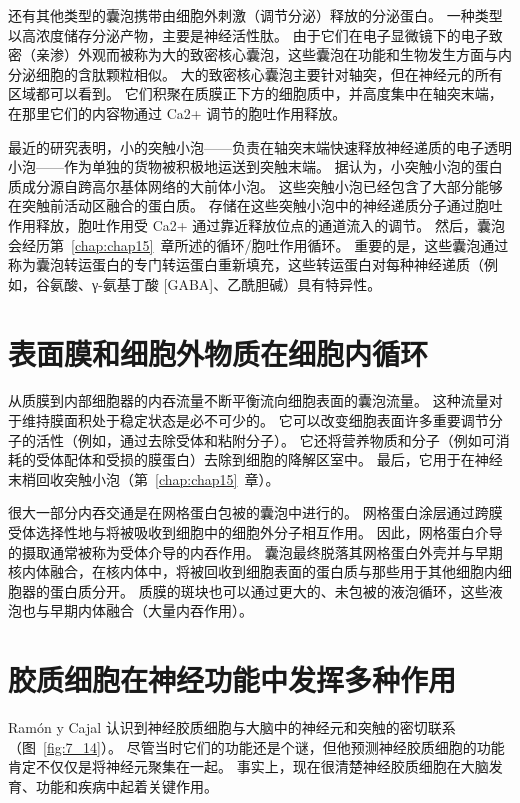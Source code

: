 还有其他类型的囊泡携带由细胞外刺激（调节分泌）释放的分泌蛋白。
一种类型以高浓度储存分泌产物，主要是神经活性肽。
由于它们在电子显微镜下的电子致密（亲渗）外观而被称为大的致密核心囊泡，这些囊泡在功能和生物发生方面与内分泌细胞的含肽颗粒相似。
大的致密核心囊泡主要针对轴突，但在神经元的所有区域都可以看到。
它们积聚在质膜正下方的细胞质中，并高度集中在轴突末端，在那里它们的内容物通过 Ca2+ 调节的胞吐作用释放。


最近的研究表明，小的突触小泡——负责在轴突末端快速释放神经递质的电子透明小泡——作为单独的货物被积极地运送到突触末端。
据认为，小突触小泡的蛋白质成分源自跨高尔基体网络的大前体小泡。
这些突触小泡已经包含了大部分能够在突触前活动区融合的蛋白质。
存储在这些突触小泡中的神经递质分子通过胞吐作用释放，胞吐作用受 Ca2+ 通过靠近释放位点的通道流入的调节。
然后，囊泡会经历第~\ref{chap:chap15}~章所述的循环/胞吐作用循环。
重要的是，这些囊泡通过称为囊泡转运蛋白的专门转运蛋白重新填充，这些转运蛋白对每种神经递质（例如，谷氨酸、γ-氨基丁酸 [GABA]、乙酰胆碱）具有特异性。



\section{表面膜和细胞外物质在细胞内循环}

从质膜到内部细胞器的内吞流量不断平衡流向细胞表面的囊泡流量。
这种流量对于维持膜面积处于稳定状态是必不可少的。
它可以改变细胞表面许多重要调节分子的活性（例如，通过去除受体和粘附分子）。
它还将营养物质和分子（例如可消耗的受体配体和受损的膜蛋白）去除到细胞的降解区室中。
最后，它用于在神经末梢回收突触小泡（第~\ref{chap:chap15}~章）。


很大一部分内吞交通是在网格蛋白包被的囊泡中进行的。 
网格蛋白涂层通过跨膜受体选择性地与将被吸收到细胞中的细胞外分子相互作用。
因此，网格蛋白介导的摄取通常被称为受体介导的内吞作用。
囊泡最终脱落其网格蛋白外壳并与早期核内体融合，在核内体中，将被回收到细胞表面的蛋白质与那些用于其他细胞内细胞器的蛋白质分开。
质膜的斑块也可以通过更大的、未包被的液泡循环，这些液泡也与早期内体融合（大量内吞作用）。



\section{胶质细胞在神经功能中发挥多种作用}

Ramón y Cajal 认识到神经胶质细胞与大脑中的神经元和突触的密切联系（图~\ref{fig:7_14}）。 
尽管当时它们的功能还是个谜，但他预测神经胶质细胞的功能肯定不仅仅是将神经元聚集在一起。
事实上，现在很清楚神经胶质细胞在大脑发育、功能和疾病中起着关键作用。


